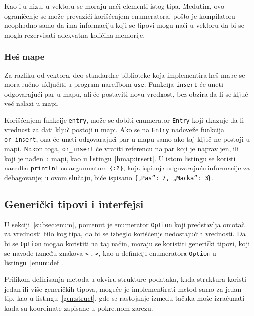 \documentclass[12pt,oneside]{memoir}
\begin{document}


Kao i u nizu, u vektoru se moraju naći elementi istog tipa. Međutim, ovo
ograničenje se može prevazići korišćenjem enumeratora, pošto je kompilatoru
neophodno samo da ima informaciju koji se tipovi mogu naći u vektoru da bi se
mogla rezervisati adekvatna količina memorije.

\subsubsection{Heš mape}

Za razliku od vektora, deo standardne biblioteke koja implementira heš mape
se mora ručno uključiti u program naredbom \texttt{use}. Funkcija \texttt{insert} će uneti
odgovarajući par u mapu, ali će postaviti novu vrednost, bez obzira da li se ključ već
nalazi u mapi.

Korišćenjem funkcije \texttt{entry}, može se dobiti enumerator \texttt{Entry} koji ukazuje
da li vrednost za dati ključ postoji u mapi. Ako se na \texttt{Entry} nadoveže funkcija
\texttt{or\_insert}, ona će uneti odgovarajući par u mapu samo ako taj ključ ne postoji u
mapi. Nakon toga, \texttt{or\_insert} će vratiti referencu na par koji je napravljen, ili koji
je nađen u mapi, kao u listingu~\ref{hmap:insert}. U istom listingu se koristi naredba
\texttt{println!} sa argumentom \texttt{\{:?\}}, koja ispisuje odgovarajuće informacije
za debagovanje; u ovom slučaju, biće ispisano \texttt{\{„Pas”: 7, „Macka”: 3\}}.



\subsection{Generički tipovi i interfejsi}
U sekciji~\ref{subsec:enum}, pomenut je enumerator \texttt{Option} koji predstavlja
omotač za vrednosti bilo kog tipa, da bi se izbeglo korišćenje nedostajućih vrednosti.
Da bi se \texttt{Option} mogao koristiti na taj način, moraju se koristiti generički
tipovi, koji se navode između znakova \texttt{<} i \texttt{>}, kao u
definiciji enumeratora \texttt{Option} u listingu~\ref{enum:def}.

Prilikom definisanja metoda u okviru strukture podataka, kada struktura koristi
jedan ili više generičkih tipova, moguće je implementirati metod samo za jedan
tip, kao u listingu~\ref{gen:struct}, gde se rastojanje između tačaka može
izračunati kada su koordinate zapisane u pokretnom zarezu.
\end{document}
